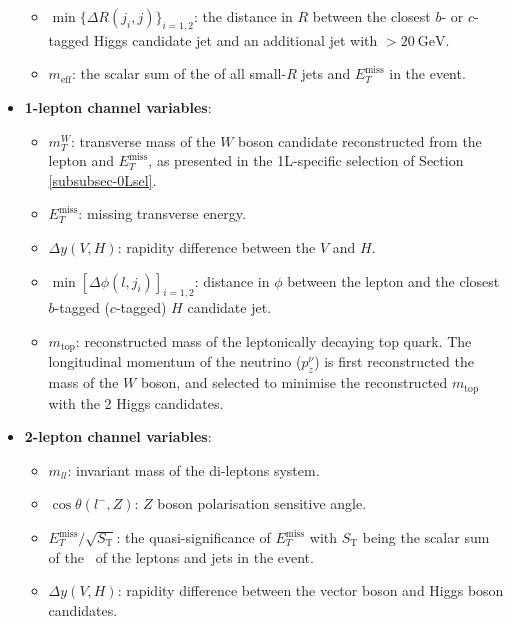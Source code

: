\begin{itemize}
\begin{itemize}
        \item $\min\{\Delta R(j_i, j)\}_{i=1,2}$: the distance in $R$ between the closest $b$- or $c$-tagged Higgs candidate jet and an additional jet with \ptv$>20~\text{GeV}$.
        \item $m_{\textrm{eff}}$: the scalar sum of the \pt of all small-$R$ jets and $E_T^{\textrm{miss}}$ in the event.
    \end{itemize}
    \item \textbf{1-lepton channel variables}:  
    \begin{itemize}
        \item $m_T^W$: transverse mass of the $W$ boson candidate reconstructed from the lepton and $E_T^{\textrm{miss}}$, as presented in the 1L-specific selection of Section \ref{subsubsec-0Lsel}.
        \item $E_T^{\textrm{miss}}$: missing transverse energy. 
        \item $\Delta y(\textbf{$V$},\textbf{$H$})$: rapidity difference between the $V$ and $H$.
        \item $\min\left[\Delta\phi(\textbf{$l$},\textbf{$j_i$})\right]_{i=1,2}$: distance in $\phi$ between the lepton and the closest $b$-tagged ($c$-tagged) $H$ candidate jet. 
        \item $m_{\text{top}}$: reconstructed mass of the leptonically decaying top quark. The longitudinal momentum of the neutrino ($p_{z}^{\nu}$) is first reconstructed the mass of the $W$ boson, and selected to minimise the reconstructed $m_{\text{top}}$ with the 2 Higgs candidates.
    \end{itemize}
    \item \textbf{2-lepton channel variables}: 
    \begin{itemize}
        \item $m_{ll}$: invariant mass of the di-leptons system.  
        \item $\cos{\theta(l^-,\textbf{$Z$})}$: $Z$ boson polarisation sensitive angle. 
        \item $E_T^{\textrm{miss}}/\sqrt{S_{\mathrm{T}}}$: the quasi-significance of $E_T^{\textrm{miss}}$ with $S_{\mathrm{T}}$ being the scalar sum of the \pt\ of the leptons and jets in the event.  
        \item $\Delta y(\textbf{$V$},\textbf{$H$})$: rapidity difference between the vector boson and Higgs boson candidates. 
    \end{itemize} 
\end{itemize}

